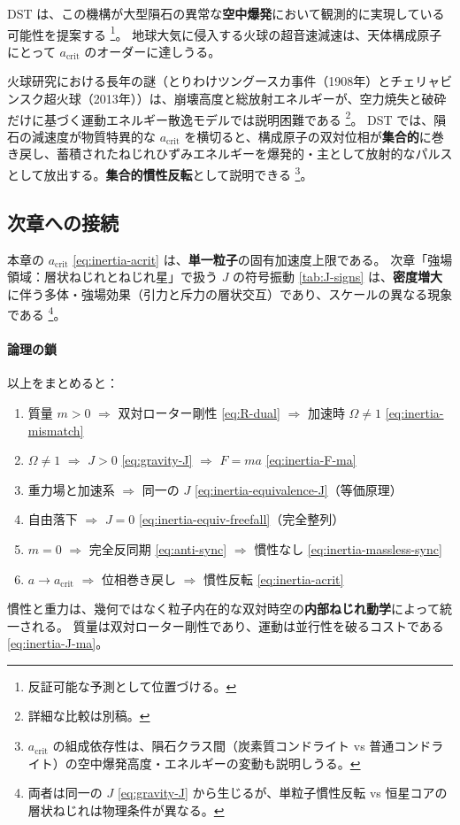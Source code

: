 \documentclass[dvipdfmx,a4paper,oneside]{jsbook}
\numberwithin{equation}{chapter}
\begin{document}
DST は、この機構が大型隕石の異常な\textbf{空中爆発}において観測的に実現している可能性を提案する \footnote{反証可能な予測として位置づける。}。
地球大気に侵入する火球の超音速減速は、天体構成原子にとって \(a_{\mathrm{crit}}\) のオーダーに達しうる。

火球研究における長年の謎（とりわけツングースカ事件（1908年）とチェリャビンスク超火球（2013年））は、崩壊高度と総放射エネルギーが、空力焼失と破砕だけに基づく運動エネルギー散逸モデルでは説明困難である \footnote{詳細な比較は別稿。}。
DST では、隕石の減速度が物質特異的な \(a_{\mathrm{crit}}\) を横切ると、構成原子の双対位相が\textbf{集合的}に巻き戻し、蓄積されたねじれひずみエネルギーを爆発的・主として放射的なパルスとして放出する。\textbf{集合的慣性反転}として説明できる \footnote{\(a_{\mathrm{crit}}\) の組成依存性は、隕石クラス間（炭素質コンドライト vs 普通コンドライト）の空中爆発高度・エネルギーの変動も説明しうる。}。

\subsection{次章への接続}

本章の \(a_{\mathrm{crit}}\) \eqref{eq:inertia-acrit} は、\textbf{単一粒子}の固有加速度上限である。
次章「強場領域：層状ねじれとねじれ星」で扱う \(J\) の符号振動 \eqref{tab:J-signs} は、\textbf{密度増大}に伴う多体・強場効果（引力と斥力の層状交互）であり、スケールの異なる現象である \footnote{両者は同一の \(J\) \eqref{eq:gravity-J} から生じるが、単粒子慣性反転 vs 恒星コアの層状ねじれは物理条件が異なる。}。

\paragraph{論理の鎖}
以上をまとめると：
\begin{enumerate}[leftmargin=2em]
  \item 質量 \(m > 0\) \(\Rightarrow\) 双対ローター剛性 \eqref{eq:R-dual} \(\Rightarrow\) 加速時 \(\Omega \neq 1\) \eqref{eq:inertia-mismatch}
  \item \(\Omega \neq 1\) \(\Rightarrow\) \(J > 0\) \eqref{eq:gravity-J} \(\Rightarrow\) \(F = ma\) \eqref{eq:inertia-F-ma}
  \item 重力場と加速系 \(\Rightarrow\) 同一の \(J\) \eqref{eq:inertia-equivalence-J}（等価原理）
  \item 自由落下 \(\Rightarrow\) \(J = 0\) \eqref{eq:inertia-equiv-freefall}（完全整列）
  \item \(m = 0\) \(\Rightarrow\) 完全反同期 \eqref{eq:anti-sync} \(\Rightarrow\) 慣性なし \eqref{eq:inertia-massless-sync}
  \item \(a \to a_{\mathrm{crit}}\) \(\Rightarrow\) 位相巻き戻し \(\Rightarrow\) 慣性反転 \eqref{eq:inertia-acrit}
\end{enumerate}
慣性と重力は、幾何ではなく粒子内在的な双対時空の\textbf{内部ねじれ動学}によって統一される。
質量は双対ローター剛性であり、運動は並行性を破るコストである \eqref{eq:inertia-J-ma}。
\end{document}
